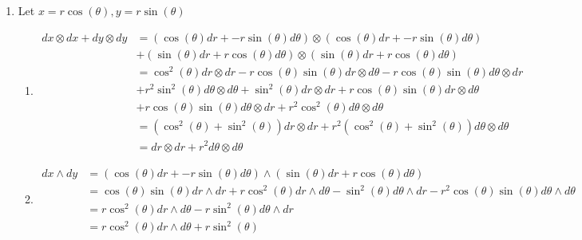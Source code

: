 \documentclass[12pt, letterpaper]{article}
\begin{document}
\begin{enumerate}
	\item Let $x = r \cos (\theta), y = r \sin (\theta)$
	\begin{enumerate}
		\item 
		\begin{align*}
			dx \otimes dx + dy \otimes dy &= (\cos (\theta) dr + - r \sin (\theta) d \theta) \otimes (\cos (\theta) dr + - r \sin (\theta) d \theta)\\ &+ (\sin (\theta) dr + r \cos (\theta) d \theta) \otimes (\sin (\theta) dr + r \cos (\theta) d \theta)\\
			&= \cos^2(\theta) dr \otimes dr - r \cos(\theta) \sin (\theta) dr \otimes d\theta - r \cos(\theta) \sin (\theta) d\theta \otimes dr\\
			&+ r^2 \sin^2(\theta) d\theta \otimes d \theta + 
			\sin^2(\theta)dr \otimes dr + r \cos(\theta) \sin (\theta) dr \otimes d\theta\\
			& + r \cos(\theta) \sin (\theta) d\theta \otimes dr	+ r^2 \cos^2(\theta) d \theta \otimes d \theta\\
			&= (\cos^2(\theta) + \sin^2(\theta))dr \otimes dr + r^2(\cos^2(\theta) + \sin^2(\theta))d\theta \otimes d\theta\\
			&= dr \otimes dr + r^2 d\theta \otimes d\theta
		\end{align*}
		\item 
		\begin{align*}
		dx \wedge dy &= (\cos (\theta) dr + - r \sin (\theta) d \theta) \wedge (\sin (\theta) dr + r \cos (\theta) d \theta)\\
		&= \cos(\theta)\sin(\theta)dr \wedge dr +
		 r \cos^2(\theta)dr \wedge d\theta -\sin^2(\theta)
		 d\theta \wedge dr - r^2 \cos(\theta)\sin(\theta) 
		 d \theta \wedge d \theta\\
		 &= r \cos^2(\theta)dr \wedge d\theta -r\sin^2(\theta)
		 d\theta \wedge dr\\
		 &= r \cos^2(\theta)dr \wedge d\theta +r\sin^2(\theta)

\end{align*}
\end{enumerate}
\end{enumerate}
\end{document}
